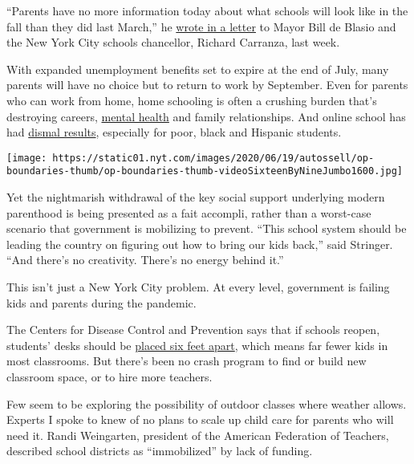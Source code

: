 ``Parents have no more information today about what schools will look
like in the fall than they did last March,'' he
\href{https://comptroller.nyc.gov/wp-content/uploads/2020/06/6.26.20-Letter-to-Mayor-de-Blasio-and-Chancellor-Carranza.pdf?utm_source=Media-All\&utm_campaign=5d9c0fee2b-EMAIL_CAMPAIGN_2017_05_31_COPY_01\&utm_medium=email\&utm_term=0_7cd514b03e-5d9c0fee2b-\&utm_source=Media-All\&utm_campaign=5d9c0fee2b-EMAIL_CAMPAIGN_2017_05_31_COPY_01\&utm_medium=email\&utm_term=0_7cd514b03e-5d9c0fee2b-154094945}{wrote
in a letter} to Mayor Bill de Blasio and the New York City schools
chancellor, Richard Carranza, last week.

With expanded unemployment benefits set to expire at the end of July,
many parents will have no choice but to return to work by September.
Even for parents who can work from home, home schooling is often a
crushing burden that's destroying careers,
\href{https://www.nytimes.com/2020/06/23/parenting/parental-burnout-coronavirus.html}{mental
health} and family relationships. And online school has had
\href{https://www.nytimes.com/2020/06/05/us/coronavirus-education-lost-learning.html}{dismal
results}, especially for poor, black and Hispanic students.

\texttt{[image: https://static01.nyt.com/images/2020/06/19/autossell/op-boundaries-thumb/op-boundaries-thumb-videoSixteenByNineJumbo1600.jpg]}

Yet the nightmarish withdrawal of the key social support underlying
modern parenthood is being presented as a fait accompli, rather than a
worst-case scenario that government is mobilizing to prevent. ``This
school system should be leading the country on figuring out how to bring
our kids back,'' said Stringer. ``And there's no creativity. There's no
energy behind it.''

This isn't just a New York City problem. At every level, government is
failing kids and parents during the pandemic.

The Centers for Disease Control and Prevention says that if schools
reopen, students' desks should be
\href{https://www.cdc.gov/coronavirus/2019-ncov/downloads/php/CDC-Activities-Initiatives-for-COVID-19-Response.pdf}{placed
six feet apart}, which means far fewer kids in most classrooms. But
there's been no crash program to find or build new classroom space, or
to hire more teachers.

Few seem to be exploring the possibility of outdoor classes where
weather allows. Experts I spoke to knew of no plans to scale up child
care for parents who will need it. Randi Weingarten, president of the
American Federation of Teachers, described school districts as
``immobilized'' by lack of funding.


